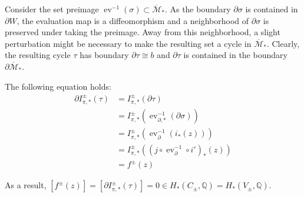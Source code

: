 Consider the set preimage $\operatorname{ev}^{-1}(\sigma) \subset \overline{\mathcal M}_*$.
As the boundary $\partial \sigma$ is contained in $\partial W$, the evaluation map is a diffeomorphism
and a neighborhood of $\partial \sigma$ is preserved under taking the preimage.
Away from this neighborhood, a slight perturbation might be necessary to make the resulting set a cycle in $\overline{\mathcal M}_*$.
Clearly, the resulting cycle $\tau$ has boundary $\partial \tau \cong b$ and $\partial \tau$ is contained in the boundary $\partial \overline{\mathcal M}_*$.

The following equation holds:
\begin{align*}
    \partial I_{\pi,*}^\pm(\tau) &= I_{\pi,*}^\pm(\partial \tau)\\
    &= I_{\pi, *}^\pm(\operatorname{ev}_{\partial, *}^{-1}(\partial \sigma))\\
    &= I_{\pi, *}^\pm(\operatorname{ev}_\partial^{-1}(i_*(z)))\\
    &= I_{\pi, *}^\pm\left((j \circ \operatorname{ev}_\partial^{-1} \circ i')_*(z)\right)\\
    &= f^\pm(z)
\end{align*}

As a result, $\left[f^\pm(z)\right] = \left[\partial I_{\pi,*}^\pm(\tau)\right] = 0 \in H_*(C_\pm, \mathbb Q) = H_*(V_\pm, \mathbb Q)$.